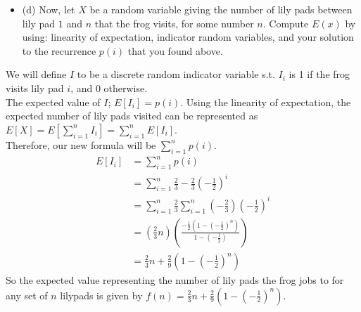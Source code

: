\documentclass{article}
\begin{document}
\begin{enumerate}
\begin{itemize}
    \item (d) Now, let $X$ be a random variable giving the number of lily pads between lily pad $1$ and $n$ that the frog visits, for some number $n$. Compute $E(x)$ by using: linearity of expectation, indicator random variables, and your solution to the recurrence $p(i)$ that you found above. 
\end{itemize}
We will define $I$ to be a discrete random indicator variable s.t. $I_i$ is 1 if the frog visits lily pad $i$, and 0 otherwise. \\
The expected value of $I$; $E[I_i] = p(i)$. Using the linearity of expectation, the expected number of lily pads visited can be represented as $E[X] = E[ \sum_{i=1}^{n}I_i ] = \sum_{i=1}^{n}E[I_i]$. \\
Therefore, our new formula will be $\sum_{i=1}^{n}p(i)$. \\
\begin{align*}
    E[I_i] & = \sum_{i=1}^{n}p(i) \\
    & = \sum_{i=1}^{n} \frac{2}{3} -\frac{2}{3}(-\frac{1}{2})^i \\
    & = \sum_{i=1}^{n} \frac{2}{3} \sum_{i=1}^{n} (-\frac{2}{3})(-\frac{1}{2})^i \\
    & = (\frac{2}{3}n)(\frac{-\frac{1}{2}(1-(-\frac{1}{2})^n)}{1-(-\frac{1}{2})}) \\
    & = \frac{2}{3}n + \frac{2}{9}(1-(-\frac{1}{2})^n)
\end{align*}
So the expected value representing the number of lily pads the frog jobs to for any set of $n$ lilypads is given by $f(n) = \frac{2}{3}n + \frac{2}{9}(1-(-\frac{1}{2})^n) $.






\end{enumerate}
\end{document}
